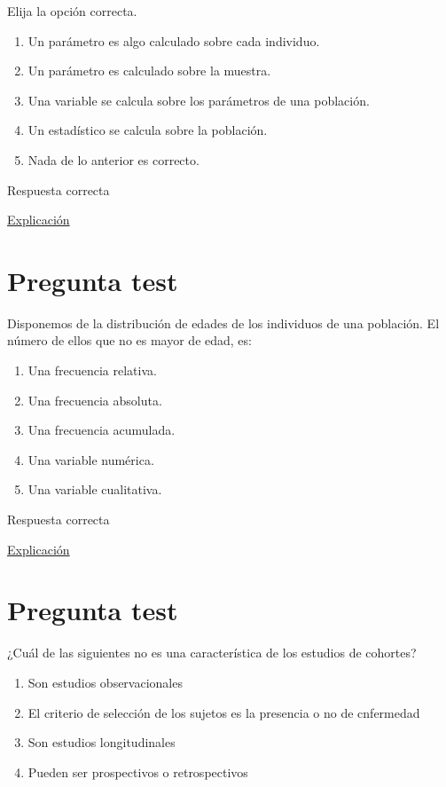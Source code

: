 \documentclass[
]{book}
\providecommand{\tightlist}{%
  \setlength{\itemsep}{0pt}\setlength{\parskip}{0pt}}
\begin{document}
Elija la opción correcta.

\begin{enumerate}
\def\labelenumi{\alph{enumi})}
\tightlist
\item
  Un parámetro es algo calculado sobre cada individuo.
\item
  Un parámetro es calculado sobre la muestra.
\item
  Una variable se calcula sobre los parámetros de una población.
\item
  Un estadístico se calcula sobre la población.
\item
  Nada de lo anterior es correcto.
\end{enumerate}

Respuesta correcta

\href{https://1fjmanzano.github.io/bioestadistica/conceptos-previos.html}{Explicación}

\hypertarget{pregunta-test-22}{%
\section{Pregunta test}\label{pregunta-test-22}}

Disponemos de la distribución de edades de los individuos de una población. El número de ellos que no es mayor de edad, es:

\begin{enumerate}
\def\labelenumi{\alph{enumi})}
\tightlist
\item
  Una frecuencia relativa.
\item
  Una frecuencia absoluta.
\item
  Una frecuencia acumulada.
\item
  Una variable numérica.
\item
  Una variable cualitativa.
\end{enumerate}

Respuesta correcta

\href{https://1fjmanzano.github.io/bioestadistica/tablas-de-frecuencias.html}{Explicación}

\hypertarget{pregunta-test-23}{%
\section{Pregunta test}\label{pregunta-test-23}}

¿Cuál de las siguientes no es una característica de los estudios de cohortes?

\begin{enumerate}
\def\labelenumi{\alph{enumi})}
\tightlist
\item
  Son estudios observacionales
\item
  El criterio de selección de los sujetos es la presencia o no de cnfermedad
\item
  Son estudios longitudinales
\item
  Pueden ser prospectivos o retrospectivos
\end{enumerate}
\end{document}
